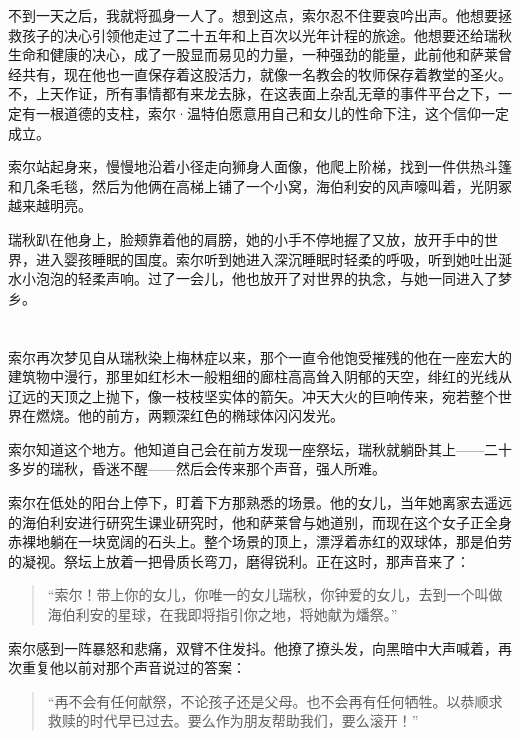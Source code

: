 \documentclass[AutoFakeBold=true]{book}
\begin{document}
{\kaishu 不到一天之后，我就将孤身一人了。}想到这点，索尔忍不住要哀吟出声。他想要拯救孩子的决心引领他走过了二十五年和上百次以光年计程的旅途。他想要还给瑞秋生命和健康的决心，成了一股显而易见的力量，一种强劲的能量，此前他和萨莱曾经共有，现在他也一直保存着这股活力，就像一名教会的牧师保存着教堂的圣火。不，上天作证，所有事情都有来龙去脉，在这表面上杂乱无章的事件平台之下，一定有一根道德的支柱，索尔·温特伯愿意用自己和女儿的性命下注，这个信仰一定成立。

索尔站起身来，慢慢地沿着小径走向狮身人面像，他爬上阶梯，找到一件供热斗篷和几条毛毯，然后为他俩在高梯上铺了一个小窝，海伯利安的风声嚎叫着，光阴冢越来越明亮。

瑞秋趴在他身上，脸颊靠着他的肩膀，她的小手不停地握了又放，放开手中的世界，进入婴孩睡眠的国度。索尔听到她进入深沉睡眠时轻柔的呼吸，听到她吐出涎水小泡泡的轻柔声响。过了一会儿，他也放开了对世界的执念，与她一同进入了梦乡。

\chapter{}

索尔再次梦见自从瑞秋染上梅林症以来，那个一直令他饱受摧残的他在一座宏大的建筑物中漫行，那里如红杉木一般粗细的廊柱高高耸入阴郁的天空，绯红的光线从辽远的天顶之上抛下，像一枝枝坚实体的箭矢。冲天大火的巨响传来，宛若整个世界在燃烧。他的前方，两颗深红色的椭球体闪闪发光。

索尔知道这个地方。他知道自己会在前方发现一座祭坛，瑞秋就躺卧其上——二十多岁的瑞秋，昏迷不醒——然后会传来那个声音，强人所难。

索尔在低处的阳台上停下，盯着下方那熟悉的场景。他的女儿，当年她离家去遥远的海伯利安进行研究生课业研究时，他和萨莱曾与她道别，而现在这个女子正全身赤裸地躺在一块宽阔的石头上。整个场景的顶上，漂浮着赤红的双球体，那是伯劳的凝视。祭坛上放着一把骨质长弯刀，磨得锐利。正在这时，那声音来了：

\begin{quotation}
	{\kaishu ``索尔！带上你的女儿，你唯一的女儿瑞秋，你钟爱的女儿，去到一个叫做海伯利安的星球，在我即将指引你之地，将她献为燔祭。''}
\end{quotation}

索尔感到一阵暴怒和悲痛，双臂不住发抖。他撩了撩头发，向黑暗中大声喊着，再次重复他以前对那个声音说过的答案：

\begin{quotation}
	{\kaishu ``再不会有任何献祭，不论孩子还是父母。也不会再有任何牺牲。以恭顺求救赎的时代早已过去。要么作为朋友帮助我们，要么滚开！''}
\end{quotation}
\end{document}

